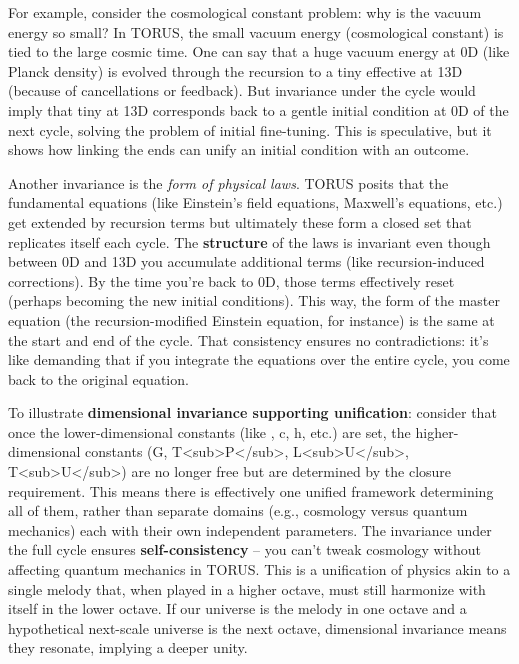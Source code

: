\documentclass[]{article}
\begin{document}
For example, consider the cosmological constant problem: why is the
vacuum energy so small? In TORUS, the small vacuum energy (cosmological
constant) is tied to the large cosmic time. One can say that a huge
vacuum energy at 0D (like Planck density) is evolved through the
recursion to a tiny effective \Lambda at 13D (because of cancellations or
feedback). But invariance under the cycle would imply that tiny \Lambda at 13D
corresponds back to a gentle initial condition at 0D of the next cycle,
solving the problem of initial fine-tuning. This is speculative, but it
shows how linking the ends can unify an initial condition with an
outcome.

Another invariance is the \emph{form of physical laws}. TORUS posits
that the fundamental equations (like Einstein's field equations,
Maxwell's equations, etc.) get extended by recursion terms but
ultimately these form a closed set that replicates itself each cycle.
The \textbf{structure} of the laws is invariant even though between 0D
and 13D you accumulate additional terms (like recursion-induced
corrections). By the time you're back to 0D, those terms effectively
reset (perhaps becoming the new initial conditions). This way, the form
of the master equation (the recursion-modified Einstein equation, for
instance) is the same at the start and end of the cycle​. That
consistency ensures no contradictions: it's like demanding that if you
integrate the equations over the entire cycle, you come back to the
original equation.

To illustrate \textbf{dimensional invariance supporting unification}:
consider that once the lower-dimensional constants (like \alpha, c, h, etc.)
are set, the higher-dimensional constants (G,
T\textless{}sub\textgreater{}P\textless{}/sub\textgreater{},
L\textless{}sub\textgreater{}U\textless{}/sub\textgreater{},
T\textless{}sub\textgreater{}U\textless{}/sub\textgreater{}) are no
longer free but are determined by the closure requirement​. This means
there is effectively one unified framework determining all of them,
rather than separate domains (e.g., cosmology versus quantum mechanics)
each with their own independent parameters. The invariance under the
full cycle ensures \textbf{self-consistency} -- you can't tweak
cosmology without affecting quantum mechanics in TORUS. This is a
unification of physics akin to a single melody that, when played in a
higher octave, must still harmonize with itself in the lower octave. If
our universe is the melody in one octave and a hypothetical next-scale
universe is the next octave, dimensional invariance means they resonate,
implying a deeper unity.
\end{document}
